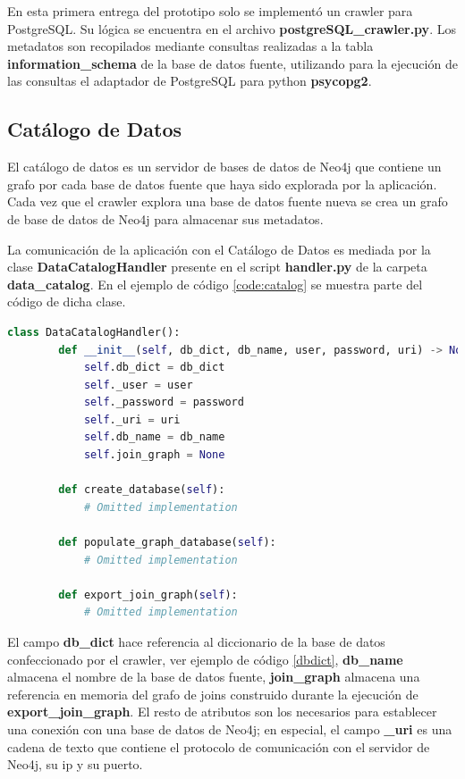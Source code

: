 En esta primera entrega del prototipo solo se implement\'o un crawler para PostgreSQL. Su l\'ogica 
se encuentra en el archivo \textbf{postgreSQL\_crawler.py}. Los metadatos son recopilados mediante consultas 
realizadas
a la tabla \textbf{information\_schema} de la base de datos fuente, utilizando para la ejecución de las consultas 
el adaptador de PostgreSQL para python \textbf{psycopg2}.




\subsection{Catálogo de Datos}

El catálogo de datos es un servidor de bases de datos de Neo4j que contiene un grafo por cada base de datos 
fuente que haya sido explorada por la aplicación. Cada vez que el crawler explora una base de datos fuente nueva se crea 
un grafo de base de datos de Neo4j para almacenar sus metadatos.

La comunicación de la aplicación con el Catálogo de Datos es mediada por la clase \textbf{DataCatalogHandler} 
presente en el script \textbf{handler.py} de la carpeta \textbf{data\_catalog}. En el ejemplo de c\'odigo 
\ref{code:catalog} se muestra parte del código de dicha clase.

\begin{lstlisting}[label={code:catalog}, caption={Clase DataCatalogHandler}, language={python}]
    class DataCatalogHandler():
        def __init__(self, db_dict, db_name, user, password, uri) -> None:
            self.db_dict = db_dict
            self._user = user
            self._password = password
            self._uri = uri
            self.db_name = db_name
            self.join_graph = None

        def create_database(self):
            # Omitted implementation

        def populate_graph_database(self):
            # Omitted implementation

        def export_join_graph(self):
            # Omitted implementation

\end{lstlisting}

El campo \textbf{db\_dict} hace referencia al diccionario de la base de datos confeccionado por el crawler, ver ejemplo de c\'odigo \ref{dbdict}, 
\textbf{db\_name} almacena el  
nombre de la base de datos fuente, \textbf{join\_graph} almacena una referencia en memoria del grafo de joins construido 
durante la ejecución de \textbf{export\_join\_graph}. El resto de atributos 
son los necesarios para establecer una conexión con una base de datos de Neo4j; en especial, el campo \textbf{\_uri} 
es una cadena de texto que contiene el protocolo de comunicación con el servidor de Neo4j, su ip y su puerto. 

